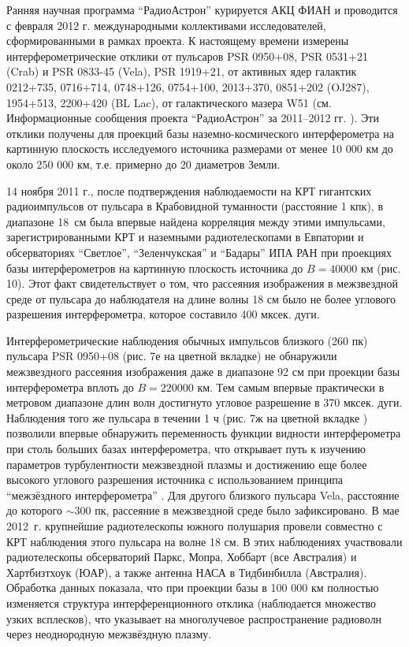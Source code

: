 Ранняя научная программа ``РадиоАстрон'' курируется АКЦ ФИАН и проводится с
февраля 2012 г. международными коллективами исследователей, сформированными
в рамках проекта.
К настоящему времени
измерены интерферометрические отклики от пульсаров PSR 0950+08,
PSR 0531+21 (Crab) и PSR 0833-45 (Vela), PSR 1919+21, от активных ядер
галактик 0212+735, 0716+714, 0748+126, 0754+100, 2013+370, 0851+202
(OJ287), 1954+513, 2200+420 (BL Lac), от галактического мазера
W51 (см. Информационные сообщения проекта ``РадиоАстрон'' за 2011--2012 гг.
\cite{}).
Эти отклики получены для проекций базы наземно-космического
интерферометра на картинную плоскость исследуемого источника размерами
от менее 10 000 км до около 250 000 км, т.е. примерно до
20 диаметров Земли.

14 ноября 2011 г., после подтверждения наблюдаемости на КРТ гигантских
радиоимпульсов от пульсара в Крабовидной туманности (расстояние 1 кпк),
в диапазоне 18~см была впервые найдена корреляция между этими импульсами,
зарегистрированными КРТ и наземными радиотелескопами в Евпатории и
обсерваториях ``Светлое'', ``Зеленчукская'' и ``Бадары'' ИПА РАН при
проекциях базы интерферометров на картинную плоскость источника
до $B = 40 000$ км (рис. 10).
 Этот факт свидетельствует о том, что
рассеяния изображения в межзвездной среде от пульсара до наблюдателя
на длине волны 18 см было не более углового разрешения интерферометра,
которое составило 400 мксек. дуги.


Интерферометрические наблюдения обычных импульсов близкого (260 пк)
пульсара PSR 0950+08 (рис. 7е на цветной вкладке) не обнаружили межзвездного рассеяния
изображения даже в диапазоне 92 см при  проекции базы интерферометра
вплоть до $B=220 000$ км. Тем самым впервые практически в метровом
диапазоне длин волн достигнуто угловое разрешение в  370
мксек. дуги.
Наблюдения того же пульсара в течении 1 ч (рис. 7ж на цветной вкладке ) позволили впервые
обнаружить переменность функции видности интерферометра при столь
больших базах интерферометра, что открывает путь к изучению параметров
турбулентности межзвездной плазмы и достижению еще более высокого углового
разрешения источника с использованием принципа ``межзёздного интерферометра''
 \cite{}.
Для другого близкого пульсара Vela, расстояние до которого $\sim 300$ пк,
рассеяние в межзвездной среде было зафиксировано.
В мае 2012~г. крупнейшие радиотелескопы южного полушария провели совместно
с КРТ наблюдения этого пульсара на волне 18 см.
В этих наблюдениях участвовали радиотелескопы обсерваторий Паркс, Мопра,
Хоббарт (все Австралия) и Хартбизтхоук (ЮАР), а также антенна НАСА в
Тидбинбилла (Австралия). Обработка данных показала, что при проекции базы
в 100 000 км полностью изменяется структура интерференционного отклика
(наблюдается множество узких всплесков), что указывает на многолучевое
распространение радиоволн через неоднородную межзвёздную плазму.

